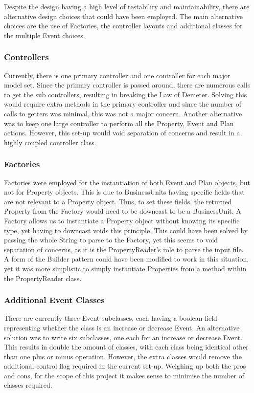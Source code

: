 \documentclass[]{article}
\begin{document}
Despite the design having a high level of testability and maintainability, there are alternative design choices that could have been employed. The main alternative choices are the use of Factories, the controller layouts and additional classes for the multiple Event choices.

\subsubsection*{Controllers}
Currently, there is one primary controller and one controller for each major model set. Since the primary controller is passed around, there are numerous calls to get the sub controllers, resulting in breaking the Law of Demeter. Solving this would require extra methods in the primary controller and since the number of calls to getters was minimal, this was not a major concern. Another alternative was to keep one large controller to perform all the Property, Event and Plan actions. However, this set-up would void separation of concerns and result in a highly coupled controller class.

\subsubsection*{Factories}
Factories were employed for the instantiation of both Event and Plan objects, but not for Property objects. This is due to BusinessUnits having specific fields that are not relevant to a Property object. Thus, to set these fields, the returned Property from the Factory would need to be downcast to be a BusinessUnit. A Factory allows us to instantiate a Property object without knowing its specific type, yet having to downcast voids this principle. This could have been solved by passing the whole String to parse to the Factory, yet this seems to void separation of concerns, as it is the PropertyReader's role to parse the input file. A form of the Builder pattern could have been modified to work in this situation, yet it was more simplistic to simply instantiate Properties from a method within the PropertyReader class.

\subsubsection*{Additional Event Classes}

There are currently three Event subclasses, each having a boolean field representing whether the class is an increase or decrease Event. An alternative solution was to write six subclasses, one each for an increase or decrease Event. This results in double the amount of classes, with each class being identical other than one plus or minus operation. However, the extra classes would remove the additional control flag required in the current set-up. Weighing up both the pros and cons, for the scope of this project it makes sense to minimise the number of classes required.

\end{document}

